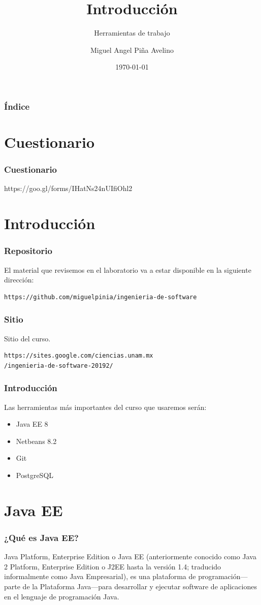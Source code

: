 \documentclass{beamer}
\title[Laboratorio]{Introducción}
\subtitle{Herramientas de trabajo}
\author[Miguel]{Miguel Angel Piña Avelino}
\institute[UNAM]{
  Facultad de Ciencias, UNAM
}
\date{\today}
\begin{document}
\frame{\titlepage}

\begin{frame}
  \frametitle{Índice}
  \tableofcontents
\end{frame}

\section{Cuestionario}

\begin{frame}
  \frametitle{Cuestionario}
  https://goo.gl/forms/IHatNs24nUIfiOhl2
\end{frame}

\section{Introducción}

\begin{frame}[fragile]
  \frametitle{Repositorio}
  El material que revisemos en el laboratorio va a estar disponible en
  la siguiente dirección:
\begin{verbatim}
https://github.com/miguelpinia/ingenieria-de-software
\end{verbatim}
\end{frame}

\begin{frame}[fragile]
  \frametitle{Sitio}
  Sitio del curso.
\begin{verbatim}
https://sites.google.com/ciencias.unam.mx
/ingenieria-de-software-20192/
\end{verbatim}
\end{frame}

\begin{frame}
  \frametitle{Introducción}
  Las herramientas más importantes del curso que usaremos serán:
  \begin{itemize}
    \item Java EE 8
    \item Netbeans 8.2
    \item Git
    \item PostgreSQL
  \end{itemize}
\end{frame}

\section{Java EE}

\begin{frame}
  \frametitle{¿Qué es Java EE?}
  Java Platform, Enterprise Edition o Java EE (anteriormente conocido
  como Java 2 Platform, Enterprise Edition o J2EE hasta la versión
  1.4; traducido informalmente como Java Empresarial), es una
  plataforma de programación—parte de la Plataforma Java—para
  desarrollar y ejecutar software de aplicaciones en el lenguaje de
  programación Java.
\end{frame}
\end{document}
